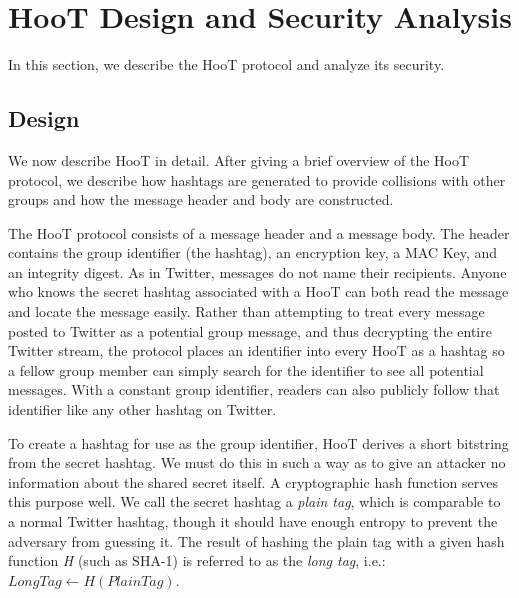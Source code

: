 \section{HooT Design and Security Analysis}
\label{sec:design-sec}

In this section, we describe the HooT protocol and analyze its security.

\subsection{Design}
\label{sec:design}

We now describe HooT in detail. After giving a brief overview of the
HooT protocol, we describe how hashtags are generated to provide
collisions with other groups and how the message header and body are
constructed. 

 The HooT protocol consists of a message
header and a message body. The header contains the group identifier (the
hashtag), an encryption key, a MAC Key, and an integrity digest. As in
Twitter, messages do not name their recipients. Anyone who knows the
secret hashtag associated with a HooT can both read the message and
locate the message easily. Rather than attempting to treat every message
posted to Twitter as a potential group message, and thus decrypting the
entire Twitter stream, the protocol places an identifier into every HooT
as a hashtag so a fellow group member can simply search for the
identifier to see all potential messages. With a constant group
identifier, readers can also publicly follow that identifier like any
other hashtag on Twitter.

 To create a hashtag for use as the group
identifier, HooT derives a short bitstring from the secret hashtag. We
must do this in such a way as to give an attacker no information about
the shared secret itself. A cryptographic hash function serves this
purpose well.
We call the secret hashtag a \textit{plain tag}, which is comparable to
a normal Twitter hashtag, though it should have enough entropy to
prevent the adversary from guessing it. The result of hashing the plain
tag with a given hash function \textit{H} (such as SHA-1) is referred to
as the \textit{long tag}, i.e.:
%
$\mathit{LongTag} \leftarrow H\left(\mathit{PlainTag}\right)$.

